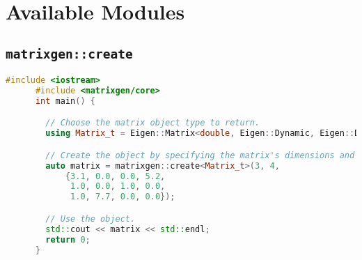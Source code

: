 \chapter{Available Modules}

  \section{\texttt{matrixgen::create}}

    \begin{lstlisting}[language=C++, caption={Basic usage of `matrixgen::create'}]
      #include <iostream>
      #include <matrixgen/core>
      int main() {

        // Choose the matrix object type to return.
        using Matrix_t = Eigen::Matrix<double, Eigen::Dynamic, Eigen::Dynamic>;

        // Create the object by specifying the matrix's dimensions and its values.
        auto matrix = matrixgen::create<Matrix_t>(3, 4,
            {3.1, 0.0, 0.0, 5.2,
             1.0, 0.0, 1.0, 0.0,
             1.0, 7.7, 0.0, 0.0});

        // Use the object.
        std::cout << matrix << std::endl;
        return 0;
      }
    \end{lstlisting}

